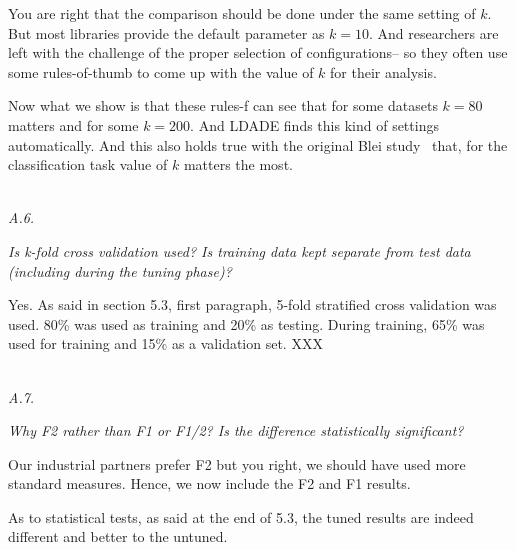 \documentclass[conference]{IEEEtran}
\begin{document}
You are right that the comparison should be done under the same setting of $k$. But most libraries provide the default parameter as $k=10$. And researchers are left with the challenge of the proper selection of configurations--
so they often use some rules-of-thumb to come up with the value of $k$ for their analysis. 

Now what we show is that these rules-f can see that for some datasets $k=80$ matters and for some $k=200$. And LDADE finds this kind of settings automatically. And this also holds true with the original Blei study~\cite{blei2003latent} that, for the classification task value of $k$ matters the most.

\noindent
\textit{\\A.6.} 

\textit{Is k-fold cross validation used?  Is training data kept separate from test data (including during the tuning phase)? \\}

Yes. As said in section 5.3, first paragraph,  5-fold stratified cross validation was used. 80\% was used as training and 20\% as testing. During training,   65\% was used for training and 15\% as a validation set. XXX

\noindent
\textit{\\A.7.}  

\textit{Why F2 rather than F1 or F1/2? Is the difference statistically significant? \\}

Our industrial partners prefer F2 but you right, we should have used more standard measures. Hence, we now
include the F2 and F1 results. 

As to statistical tests, as said at the end of 5.3, the tuned results are indeed different and better to the untuned. 

\end{document}
